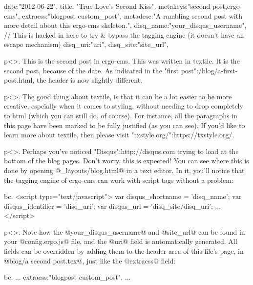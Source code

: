 {
date:"2012-06-22",
title: "True Love's Second Kiss",
metakeys:"second post,ergo-cms",
extracss:"blogpost custom_post",
metadesc:"A rambling second post with more detail about this ergo-cms skeleton.",
disq_name:"{your_disqus_username}", // This is hacked in here to try & bypass the tagging engine (it doesn't have an escape mechanism)
disq_uri:"{uri}",
disq_site:"{site_url}",
}

p<>. This is the second post in ergo-cms. This was written in textile. It is the second post, because of the date. As indicated in the "first post":/blog/a-first-post.html, the header is now slightly different.

p<>. The good thing about textile, is that it can be a lot easier to be more creative, espcially when it comes to styling, without needing to drop completely to html (which you can still do, of course). For instance, all the paragraphs in this page have been marked to be fully justified (as you can see). If you'd like to learn more about textile, then please visit "txstyle.org/":https://txstyle.org/. 

p<>. Perhaps you've noticed "Disqus":http://disqus.com trying to load at the bottom of the blog pages. Don't worry, this is expected! You can see where this is done by opening @_layouts/blog.html@ in a text editor. In it, you'll notice that the tagging engine of ergo-cms can work with script tags without a problem:



bc. <script type="text/javascript">
	var disqus_shortname = '{disq_name}';
	var disqus_identifier = '{disq_uri}';
	var disqus_url = '{disq_site}/{disq_uri}';
	...
</script>

p<>. Note how the @your_disqus_username@ and @site_url@ can be found in your @config.ergo.js@ file, and the @uri@ field is automatically generated. All fields can be overridden by adding them to the header area of this file's page, in @blog/a second post.tex@, just like the @extracss@ field:

bc. {
...
extracss:"blogpost custom_post",
...
}


